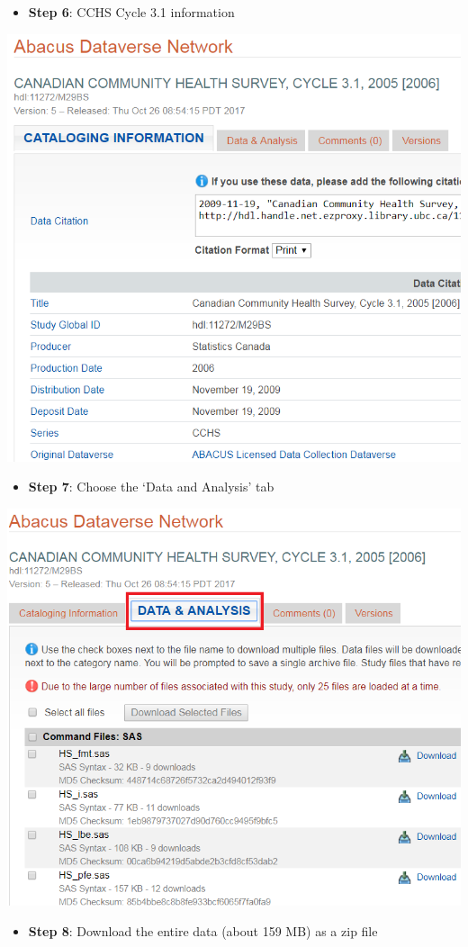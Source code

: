 \documentclass[
]{book}
\providecommand{\tightlist}{%
  \setlength{\itemsep}{0pt}\setlength{\parskip}{0pt}}
\begin{document}
\begin{itemize}
\tightlist
\item
  \textbf{Step 6}: CCHS Cycle 3.1 information
\end{itemize}

\includegraphics[width=0.65\linewidth]{images/abacus6}

\begin{itemize}
\tightlist
\item
  \textbf{Step 7}: Choose the `Data and Analysis' tab
\end{itemize}

\includegraphics[width=0.65\linewidth]{images/abacus7}

\begin{itemize}
\tightlist
\item
  \textbf{Step 8}: Download the entire data (about 159 MB) as a zip file
\end{itemize}
\end{document}
